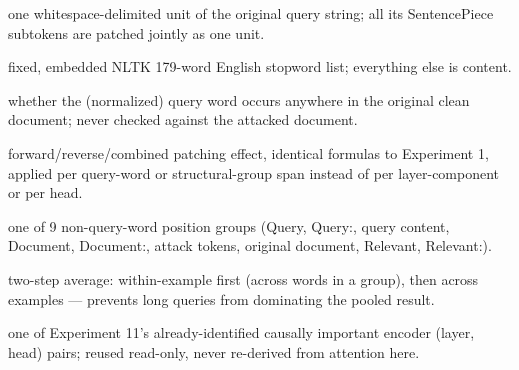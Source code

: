 \documentclass[11pt]{article}
\newcommand{\fwd}{\ensuremath{e^{\mathrm{fwd}}}}
\newcommand{\rev}{\ensuremath{e^{\mathrm{rev}}}}
\newcommand{\comb}{\ensuremath{e^{\mathrm{comb}}}}
\begin{document}
\begin{description}[leftmargin=1.6em,style=nextline]
  \item[query word] one whitespace-delimited unit of the original query string; all its
  SentencePiece subtokens are patched jointly as one unit.
  \item[content / stopword] fixed, embedded NLTK 179-word English stopword list;
  everything else is content.
  \item[matched / unmatched] whether the (normalized) query word occurs anywhere in the
  original clean document; never checked against the attacked document.
  \item[$\fwd$ / $\rev$ / $\comb$] forward/reverse/combined patching effect, identical
  formulas to Experiment 1, applied per query-word or structural-group span instead of
  per layer-component or per head.
  \item[structural group] one of 9 non-query-word position groups (Query, Query:, query
  content, Document, Document:, attack tokens, original document, Relevant, Relevant:).
  \item[example-balanced aggregate] two-step average: within-example first (across words
  in a group), then across examples — prevents long queries from dominating the pooled
  result.
  \item[important head] one of Experiment 11's already-identified causally important
  encoder (layer, head) pairs; reused read-only, never re-derived from attention here.
\end{description}
\end{document}
